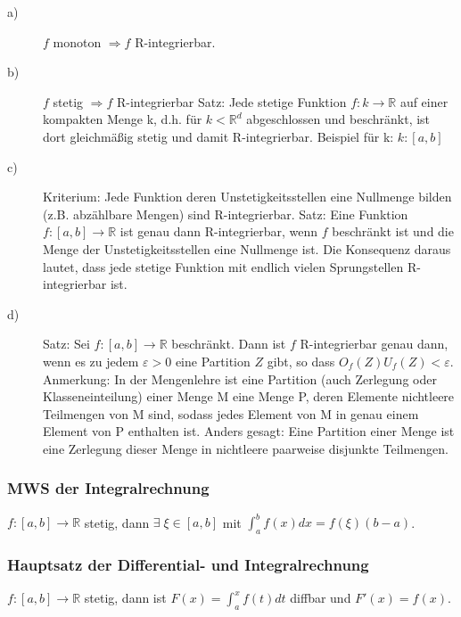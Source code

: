 \documentclass[12pt,a4paper]{article}%
\let\harvardleftorig\harvardleft
\numberwithin{equation}{section}
\newcommand{\R}{\mathbb{R}} %
\newcommand\citeVgl
{\def\harvardleft{(Vgl.\ \global\let\harvardleft\harvardleftorig}%
 \cite
}
\numberwithin{equation}{subsection}
\begin{document}
\begin{description}
\item[a)]
$f$ monoton $\Rightarrow f$ R-integrierbar.
\item[b)]
$f$ stetig $\Rightarrow f$ R-integrierbar
\newline
\glqq Satz: Jede stetige Funktion $f:k \rightarrow \R$ auf einer kompakten Menge k, d.h. für $k<\R^d$ abgeschlossen und beschränkt, ist dort gleichmäßig stetig und damit R-integrierbar.\grqq \cite{HM12}
Beispiel für k: $k:[a,b]$
\item[c)]
Kriterium: Jede Funktion deren Unstetigkeitsstellen eine Nullmenge bilden (z.B. abzählbare Mengen) sind R-integrierbar.
\glqq Satz: Eine Funktion $f:[a,b]\rightarrow \R$ ist genau dann R-integrierbar, wenn $f$ beschränkt ist und die Menge der Unstetigkeitsstellen eine Nullmenge ist. \grqq \cite{HM12}
Die Konsequenz daraus lautet, dass jede stetige Funktion mit endlich vielen Sprungstellen R-integrierbar ist. \citeVgl{HM12}
\item[d)]
\glqq Satz: Sei $f:[a,b] \rightarrow \R$ beschränkt. Dann ist $f$ R-integrierbar genau dann, wenn es zu jedem $\varepsilon > 0$ eine Partition $Z$ gibt, 
so dass
$O_f(Z)  U_f(Z) < \varepsilon$. \grqq \cite{HM12}
\newline
Anmerkung: \glqq In der Mengenlehre ist eine Partition (auch Zerlegung oder Klasseneinteilung) einer Menge M eine Menge P, deren Elemente nichtleere Teilmengen von M sind, sodass jedes Element von M in genau einem Element von P enthalten ist. Anders gesagt: Eine Partition einer Menge ist eine Zerlegung dieser Menge in nichtleere paarweise disjunkte Teilmengen.\grqq  \cite{wiki}

\end{description}

\subsubsection{MWS der Integralrechnung}
$f:[a,b]\rightarrow\R$ stetig, dann $\exists \; \xi \in[a,b]$ mit $\int_a^b f(x)dx = f(\xi)(b-a)$.

\subsubsection{Hauptsatz der Differential- und Integralrechnung}
$f:[a,b]\rightarrow\R$ stetig, dann ist $F(x) = \int_a^x f(t)dt$ diffbar und $F'(x) = f(x)$.
\end{document}
